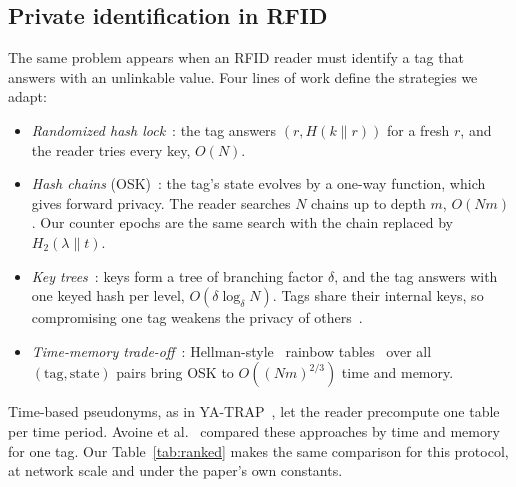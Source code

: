 \subsection{Private identification in RFID}
The same problem appears when an RFID reader must identify a tag that answers with an unlinkable value. Four lines of work
define the strategies we adapt:
\begin{itemize}
\item \emph{Randomized hash lock}~\cite{weis}: the tag answers $(r, H(k\|r))$ for a fresh $r$, and the reader tries every
key, $O(N)$.
\item \emph{Hash chains} (OSK)~\cite{ohkubo}: the tag's state evolves by a one-way function, which gives forward
privacy. The reader searches $N$ chains up to depth $m$, $O(Nm)$. Our counter epochs are the same search with the
chain replaced by $H_2(\lambda\|t)$.
\item \emph{Key trees}~\cite{molnar}: keys form a tree of branching factor $\delta$, and the tag answers with one keyed
hash per level, $O(\delta\log_\delta N)$. Tags share their internal keys, so compromising one tag weakens the privacy of
others~\cite{ado05}.
\item \emph{Time-memory trade-off}~\cite{avoine05,ado05}: Hellman-style~\cite{hellman} rainbow tables~\cite{oechslin}
over all $(\text{tag},\text{state})$ pairs bring OSK to $O((Nm)^{2/3})$ time and memory.
\end{itemize}
Time-based pseudonyms, as in YA-TRAP~\cite{tsudik}, let the reader precompute one table per time period.
Avoine et al.~\cite{ado05} compared these approaches by time and memory for one tag. Our Table~\ref{tab:ranked}
makes the same comparison for this protocol, at network scale and under the paper's own constants.

